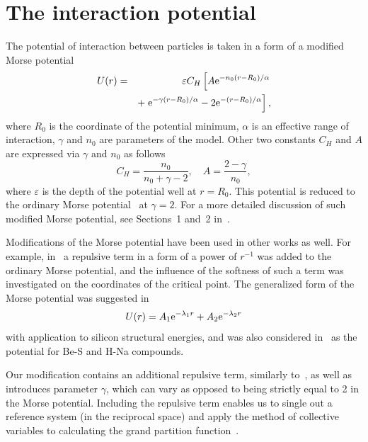 \section{\label{sec:potential}The interaction potential}
The potential of interaction between particles is taken in a form of a modified Morse potential
\begin{eqnarray}
	\label{def:mod_morse}
	U(r) & = & \varepsilon C_{H} \left[A {\rm e}^{-n_0(r-R_0)/\alpha} \right.
	\nonumber\\
	&& + \left. {\rm e}^{-\gamma(r - R_0)/\alpha} -2{\rm e}^{-(r-R_0)/\alpha}\right],
\end{eqnarray}
where $R_0$ is the coordinate of the potential minimum, $\alpha$ is an effective range of interaction, $\gamma$ and $n_0$ are parameters of the model. Other two constants $C_{H}$ and $A$ are expressed via $\gamma$ and $n_0$ as follows
\begin{equation}
	C_{H} = \frac{n_0}{n_0 + \gamma - 2}, \quad A = \frac{2 - \gamma}{n_0},
\end{equation}
where $\varepsilon$ is the depth of the potential well at $r=R_0$. This potential is reduced to the ordinary Morse potential~\cite{Morse1929} at $\gamma=2$. For a more detailed discussion of such modified Morse potential, see Sections~1 and~2 in~\cite{KozlovskiiDobush2020}.

Modifications of the Morse potential have been used in other works as well. For example, in~\cite{MartinezValenciaEtAl2013} a repulsive term in a form of a power of $r^{-1}$ was added to the ordinary Morse potential, and the influence of the softness of such a term was investigated on the coordinates of the critical point. The generalized form of the Morse potential was suggested in~\cite{BiswasHamann1985}
\begin{equation}
	U(r) = A_1 {\rm e}^{-\lambda_1 r} + A_2 {\rm e}^{-\lambda_2 r}
\end{equation} 
with application to silicon structural energies, and was also considered in~\cite{Lim2005} as the potential for Be-S and H-Na compounds.

Our modification contains an additional repulsive term, similarly to~\cite{MartinezValenciaEtAl2013}, as well as introduces parameter $\gamma$, which can vary as opposed to being strictly equal to 2 in the Morse potential. Including the repulsive term enables us to single out a reference system (in the reciprocal space) and apply the method of collective variables to calculating the grand partition function~\cite{KozlovskiiDobush2016}.

